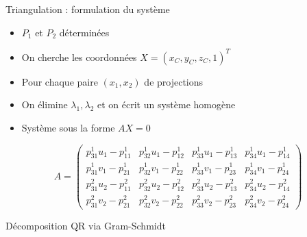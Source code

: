\begin{frame}[noframenumbering]{Triangulation : formulation du système}
\vspace*{-0.5em}
\begin{itemize}
  \item<1-> \( P_1 \) et \( P_2 \) déterminées
  \item<2-> On cherche les coordonnées \( X = (x_C, y_C, z_C, 1)^T \)
  \item<3-> Pour chaque paire \( (x_1, x_2) \) de projections
  \item<4-> On élimine \( \lambda_1, \lambda_2 \) et on écrit un système homogène
  \item<5-> Système sous la forme \( A X = 0 \)
\end{itemize}

\vspace{1em}

\pause
\pause
\pause
\pause
\begin{center}
\scriptsize
\[
A =
\left(
\begin{array}{cccc}
p_{31}^{1} u_1 - p_{11}^{1} & p_{32}^{1} u_1 - p_{12}^{1} & p_{33}^{1} u_1 - p_{13}^{1} & p_{34}^{1} u_1 - p_{14}^{1} \\
p_{31}^{1} v_1 - p_{21}^{1} & p_{32}^{1} v_1 - p_{22}^{1} & p_{33}^{1} v_1 - p_{23}^{1} & p_{34}^{1} v_1 - p_{24}^{1} \\
p_{31}^{2} u_2 - p_{11}^{2} & p_{32}^{2} u_2 - p_{12}^{2} & p_{33}^{2} u_2 - p_{13}^{2} & p_{34}^{2} u_2 - p_{14}^{2} \\
p_{31}^{2} v_2 - p_{21}^{2} & p_{32}^{2} v_2 - p_{22}^{2} & p_{33}^{2} v_2 - p_{23}^{2} & p_{34}^{2} v_2 - p_{24}^{2}
\end{array}
\right)
\]
\vspace*{1cm}
\end{center}
\end{frame}



\begin{frame}[noframenumbering]
    \scriptsize
    \begin{algorithm}[H]
\DontPrintSemicolon
{}
\BlankLine

\caption{Décomposition QR via Gram-Schmidt}
\end{algorithm}
\end{frame}

